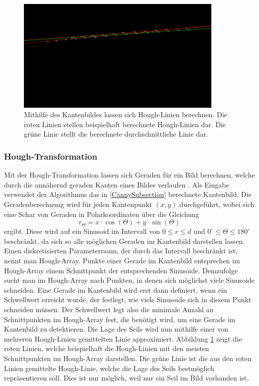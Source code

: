 \documentclass[10pt,a4paper]{scrarticle}
\begin{document}
\begin{figure}
\includegraphics[width=10cm]{Abbildungen/rope_houghLines.png}
  \centering
  \caption{Mithilfe des Kantenbildes lassen sich Hough-Linien berechnen. Die roten Linien stellen beispielhaft berechnete Hough-Linien dar. Die grüne Linie stellt die berechnete durchschnittliche Linie dar.}
  \label{fig:HoughLinien}
\end{figure}
        
		\subsubsection{Hough-Transformation}\label{Hough_Transformation}
		Mit der Hough-Transformation lassen sich Geraden für ein Bild berechnen, welche durch die annähernd geraden Kanten eines Bildes verlaufen \cite{toennies2005grundlagen}. Als Eingabe verwendet der Algorithmus das in \ref{CannySubsection} berechnete Kantenbild. Die Geradenberechnung wird für jeden Kantenpunkt $(x,y)$ durchgeführt, wobei sich eine Schar von Geraden in Polarkoordinaten über die Gleichung
		\begin{equation}
        r_{\Theta}=x\cdot\cos{\left(\Theta\right)}+y\cdot\sin{\left(\Theta\right)}  
        \end{equation}
        ergibt. Diese wird auf ein Sinusoid im Intervall von $0\leq r\leq d$ und $0^\circ\leq\Theta\leq180^\circ$ beschränkt, da sich so alle möglichen Geraden im Kantenbild darstellen lassen. Einen diskretisierten Parameterraum, der durch das Intervall beschränkt ist, nennt man Hough-Array. Punkte einer Gerade im Kantenbild entsprechen im Hough-Array einem Schnittpunkt der entsprechenden Sinusoide. Demzufolge sucht man im Hough-Array nach Punkten, in denen sich möglichst viele Sinusoide schneiden. Eine Gerade im Kantenbild wird erst dann definiert, wenn ein Schwellwert erreicht wurde, der festlegt, wie viele Sinusoide sich in diesem Punkt schneiden müssen. Der Schwellwert legt also die minimale Anzahl an Schnittpunkten im Hough-Array fest, die benötigt wird, um eine Gerade im Kantenbild zu detektieren. Die Lage des Seils wird nun mithilfe einer von mehreren Hough-Linien gemittelten Linie approximiert. Abbildung \ref{fig:HoughLinien} zeigt die roten Linien, welche beispielhaft die Hough-Linien mit den meisten Schnittpunkten im Hough-Array darstellen. Die grüne Linie ist die aus den roten Linien gemittelte Hough-Linie, welche die Lage des Seils bestmöglich repräsentieren soll. Dies ist nur möglich, weil nur ein Seil im Bild vorhanden ist.
        
\end{document}
